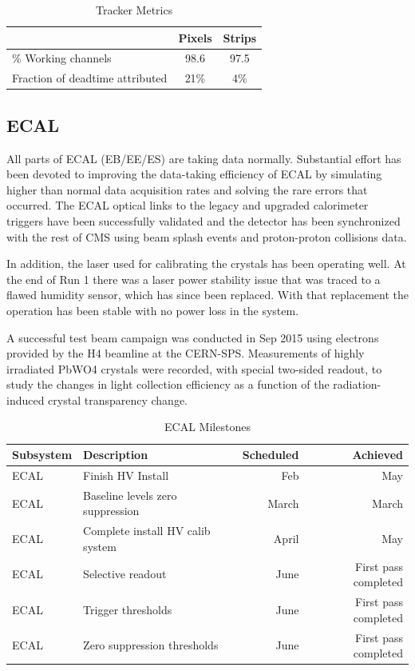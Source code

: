 \begin{table}[htp]
\caption{Tracker Metrics}
\begin{center}
\begin{tabular}{|l|c|c|}
\hline
 &Pixels&Strips\\
\hline
\% Working channels & 98.6 & 97.5 \\
\hline
Fraction of deadtime attributed& 21\%& 4\%\\
\hline
\end{tabular}
\end{center}
\label{TrackerMetrics}
\end{table}%


\subsection{ECAL }
All parts of ECAL (EB/EE/ES) are taking data normally.   Substantial effort has been devoted to improving the data-taking efficiency of ECAL by simulating higher than normal data acquisition rates and solving the rare errors that occurred. The ECAL optical links to the legacy and upgraded calorimeter triggers have been successfully validated and the detector has been synchronized with the rest of CMS using beam splash events and proton-proton collisions data.  

In addition, the laser used for calibrating the crystals has been operating well.  At the end of Run 1 there was a laser power stability issue that was traced to a flawed humidity sensor, which has since been replaced.  With that replacement the operation has been stable with no power loss in the system.

A successful test beam campaign was conducted in Sep  2015 using electrons provided by the H4 beamline at the CERN-SPS. Measurements of highly irradiated PbWO4 crystals were recorded, with special two-sided readout, to study the changes in light collection efficiency as a function of the radiation-induced crystal transparency change.

\begin{table}[htp]
\caption{ECAL Milestones}
\begin{center}
\begin{tabular}{|l|l|r|r|}
\hline
Subsystem&Description&Scheduled&Achieved\\
\hline
ECAL & Finish HV Install& Feb & May\\
\hline
ECAL & Baseline levels zero suppression& March & March \\
\hline
ECAL & Complete install HV calib system & April &May\\
\hline
ECAL & Selective readout& June & First pass completed\\
\hline
ECAL & Trigger thresholds & June &First pass completed\\
\hline
ECAL & Zero suppression thresholds & June & First pass completed \\
\hline
\end{tabular}
\end{center}
\label{ECALMilestones}
\end{table}%

